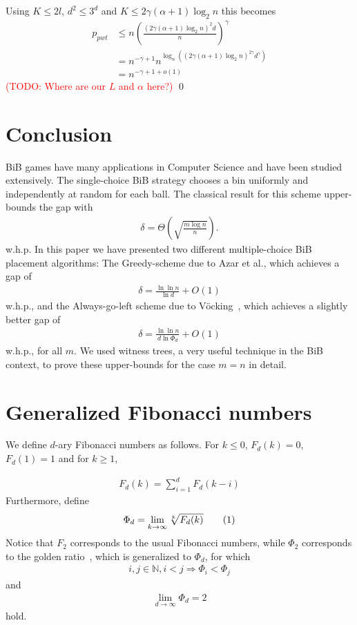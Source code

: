 \documentclass[a4paper,12pt]{article}
\newcommand\todo[1]{\textcolor{red}{(TODO: #1)}}
\newcommand\numberthis{\addtocounter{equation}{1}\tag{\theequation}}
\newcommand\neqn[1]{\numberthis\label{eqn:#1}}
\begin{document}
Using $K \leq 2l$, $d^2 \leq 3^d$ and $K \leq 2\gamma  \left( \alpha +1 \right)  \log_2 n$ this becomes
\begin{align*}
p_{pwt} &\leq n \left(\frac{\left(2\gamma  \left(\alpha +1 \right)  \log_2 n\right)^2 d}{n}\right)^\gamma \\
        &= n^{-\gamma +1}  n ^{\log_n\left( \left(2\gamma \left(\alpha+1\right) \log_2n \right)^{2\gamma}  d^\gamma \right)}\\
        &= n^{-\gamma+1+o\left(1\right)}
\end{align*}
\todo{Where are our $L$ and $\alpha$ here?}
\qed
 
\section{Conclusion}
\label{sec:conclusion}
BiB games have many applications in Computer Science and have been studied extensively. The single-choice BiB strategy chooses a bin uniformly and independently at random for each ball. The classical result for this scheme upper-bounds the gap with~\cite{RS98}
\begin{align*}
\delta =  \Theta\left(\sqrt{\frac{m  \log n}{n}}\right).
\end{align*}
w.h.p.
In this paper we have presented two different multiple-choice BiB placement algorithms: The Greedy-scheme due to Azar et al.\cite{ABKU99}, which achieves a gap of 
\begin{align*}
\delta = \frac{\ln\ln n}{\ln d} + O(1)
\end{align*}
w.h.p., and the Always-go-left scheme due to V\"ocking~\cite{VOC03}, which achieves a slightly better gap of
\begin{align*}
\delta = \frac{\ln \ln n}{d \ln \Phi_d} + O(1)
\end{align*}
w.h.p., for all $m$. We used witness trees, a very useful technique in the BiB context, to prove these upper-bounds for the case $m=n$ in detail.


\appendix
\section{Generalized Fibonacci numbers}
\label{sec:fibonacci}
We define $d$-ary Fibonacci numbers as follows. For $k \leq0$, $F_d(k) = 0$, $F_d(1) = 1$ and for $k \geq 1$,

\begin{align*}
F_d(k) = \sum_{i=1}^{d}F_d(k-i)
\end{align*}
Furthermore, define 
\begin{align*}
\Phi_d = \lim_{k \rightarrow \infty} \sqrt[k]{F_d(k)} \neqn{goldenFib}
\end{align*}
Notice that $F_2$ corresponds to the usual Fibonacci numbers, while $\Phi_2 $ corresponds to the golden ratio~\cite{Knuth73}, which is generalized to $\Phi_d$, for which 
\begin{align*}
i, j \in \mathbb{N}, i < j \Rightarrow \Phi_i < \Phi_j
\end{align*}
and 
\begin{align*}
\lim_{d\rightarrow \infty} \Phi_d = 2
\end{align*}
hold.
\end{document}
